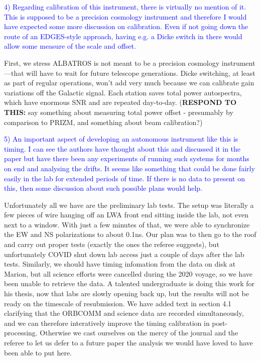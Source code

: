 \documentclass[11pt]{article}
\begin{document}
\noindent \textcolor{blue}{4) Regarding calibration of this
  instrument, there is virtually no mention of it. This is supposed to
  be a precision cosmology instrument and therefore I would have
  expected some more discussion on calibration. Even if not going down
  the route of an EDGES-style approach, having e.g. a Dicke switch in
  there would allow some measure of the scale and offset.}

First, we stress ALBATROS is not meant to be a precision cosmology
instrument---that will have to wait for future telescope generations.
Dicke switching, at least as part of regular operations, won't add
very much because we can calibrate gain variations off the Galactic
signal.  Each station saves total power autospectra, which have
enormous SNR and are repeated day-to-day.  ({\bf RESPOND TO THIS:} say
something about measuring total power offset - presumably by
comparison to PRIZM, and something about beam calibration?)

\noindent \textcolor{blue}{5) An important aspect of developing an
  autonomous instrument like this is timing. I can see the authors
  have thought about this and discussed it in the paper but have there
  been any experiments of running such systems for months on end and
  analysing the drifts. It seems like something that could be done
  fairly easily in the lab for extended periods of time. If there is
  no data to present on this, then some discussion about such possible
  plans would help.}

Unfortunately all we have are the preliminary lab tests.  The setup
was literally a few pieces of wire hanging off an LWA front end
sitting inside the lab, not even next to a window.  With just a few
minutes of that, we were able to synchronize the EW and NS
polarizations to about 0.1ns.  Our plan was to then go to the roof and
carry out proper tests (exactly the ones the referee suggests), but
unfortunately COVID shut down lab access just a couple of days after
the lab tests.  Similarly, we should have timing infomation from the
data on disk at Marion, but all science efforts were cancelled during
the 2020 voyage, so we have been unable to retrieve the data.  A
talented undergraduate is doing this work for his thesis, now that
labs are slowly opening back up, but the results will not be ready on
the timescale of resubmission.  We have added text in section 4.1
clarifying that the ORBCOMM and science data are recorded
simultaneously, and we can therefore interatively improve the timing
calibration in post-processing.  Otherwise we cast ourselves on the
mercy of the journal and the referee to let us defer to a future paper
the analysis we would have loved to have been able to put here.
\end{document}
